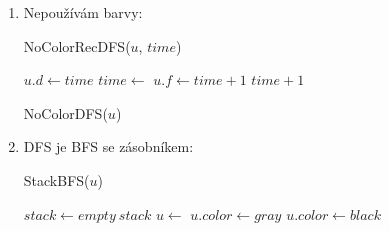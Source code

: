 \documentclass[12pt,a4paper]{extarticle}
\begin{document}
\begin{enumerate}
	\item Nepoužívám barvy:


	\begin{procedure}[H]
		\caption{NoColorRecDFS($u$, $time$)}
		\BlankLine{}
		$u.d \leftarrow time$ \;
		 {
			 {
				$time \leftarrow $  \;
			}
		}
		$u.f \leftarrow time+1$ \;
		\Return $time+1$\;
	\end{procedure}
	\begin{procedure}[H]
		\caption{NoColorDFS($u$)}
		\BlankLine{}
		 \;
	\end{procedure}

	\item DFS je BFS se zásobníkem:
	
	\begin{procedure}[H]
		\caption{StackBFS($u$)}
		\BlankLine
		$\mathit{stack} \leftarrow \mathit{empty~stack}$ \;
		 \;
		 {
			$u \leftarrow $  \;
			$\mathit{u.color} \leftarrow \mathit{gray}$ \;
			 {
				 {
					 \;
				}
			}
			$\mathit{u.color} \leftarrow \mathit{black}$ \;
		}
	\end{procedure}

\end{enumerate}
\end{document}
